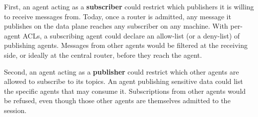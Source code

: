 \documentclass[11pt,a4paper]{article}
\begin{document}
First, an agent acting as a \textbf{subscriber} could restrict which
publishers it is willing to receive messages from. Today, once a
router is admitted, any message it publishes on the data plane
reaches any subscriber on any machine. With per-agent ACLs, a
subscribing agent could declare an allow-list (or a deny-list) of
publishing agents. Messages from other agents would be filtered at
the receiving side, or ideally at the central router, before they
reach the agent.

Second, an agent acting as a \textbf{publisher} could restrict which
other agents are allowed to subscribe to its topics. An agent
publishing sensitive data could list the specific agents that may
consume it. Subscriptions from other agents would be refused, even
though those other agents are themselves admitted to the session.
\end{document}

